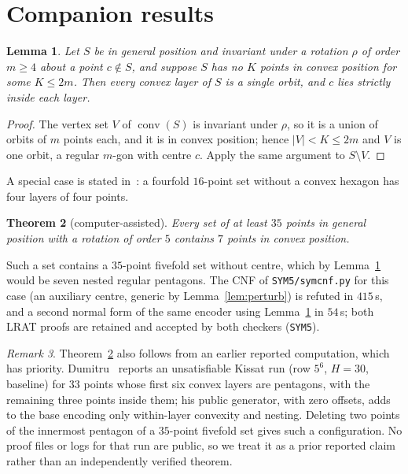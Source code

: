 \documentclass[11pt]{article}
\newtheorem{theorem}{Theorem}
\newtheorem{lemma}[theorem]{Lemma}
\theoremstyle{remark}
\newtheorem{remark}[theorem]{Remark}
\begin{document}
\section{Companion results}\label{sec:comp}
\begin{lemma}\label{lem:layers}
Let $S$ be in general position and invariant under a rotation $\rho$ of order $m\ge 4$ about a point $c\notin S$, and
suppose $S$ has no $K$ points in convex position for some $K\le 2m$. Then every convex layer of $S$ is a single orbit, and
$c$ lies strictly inside each layer.
\end{lemma}
\begin{proof}
The vertex set $V$ of $\operatorname{conv}(S)$ is invariant under $\rho$, so it is a union of orbits of $m$ points each,
and it is in convex position; hence $|V|<K\le 2m$ and $V$ is one orbit, a regular $m$-gon with centre $c$. Apply the same
argument to $S\setminus V$.
\end{proof}
A special case is stated in~\cite[\S3.2]{SMQH25}: a fourfold $16$-point set without a convex hexagon has four layers of
four points.

\begin{theorem}[computer-assisted]\label{thm:E}
Every set of at least $35$ points in general position with a rotation of order $5$ contains $7$ points in convex position.
\end{theorem}
Such a set contains a $35$-point fivefold set without centre, which by Lemma~\ref{lem:layers} would be seven nested
regular pentagons. The CNF of \texttt{SYM5/symcnf.py} for this case (an auxiliary centre, generic by
Lemma~\ref{lem:perturb}) is refuted in $415$\,s, and a second normal form of the same encoder using
Lemma~\ref{lem:layers} in $54$\,s; both LRAT proofs are retained and accepted by both checkers (\texttt{SYM5}).
\begin{remark}
Theorem~\ref{thm:E} also follows from an earlier reported computation, which has priority. Dumitru~\cite[\S7,
Table~1]{Dum25} reports an unsatisfiable Kissat run (row $5^6$, $H=30$, baseline) for $33$ points whose first six convex
layers are pentagons, with the remaining three points inside them; his public generator, with zero offsets, adds to the
base encoding only within-layer convexity and nesting. Deleting two points of the innermost pentagon of a $35$-point
fivefold set gives such a configuration. No proof files or logs for that run are public, so we treat it as a prior
reported claim rather than an independently verified theorem.
\end{remark}
\end{document}
